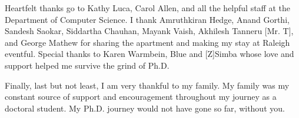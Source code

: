Heartfelt thanks go to Kathy Luca, Carol Allen, and all the helpful staff at the Department
of Computer Science. I thank Amruthkiran Hedge, Anand Gorthi, Sandesh Saokar, Siddartha Chauhan, Mayank Vaish, Akhilesh Tanneru [Mr. T], and George Mathew for
sharing the apartment and making my stay at Raleigh eventful. Special thanks to Karen Warmbein, Blue and [Z]Simba whose love and support helped me survive the grind of Ph.D.



Finally, last but not least, I am very thankful to my family. My family was my constant source of support and encouragement throughout my journey as a doctoral student. 
My Ph.D. journey would not have gone so far, without you.
